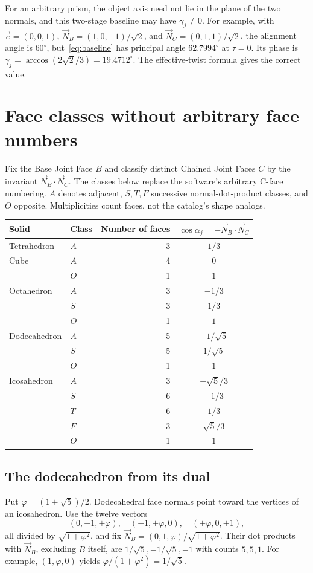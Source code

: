 \documentclass[11pt,letterpaper]{article}
\newcommand{\NB}{\vec N_B}
\newcommand{\NC}{\vec N_C}
\newcommand{\aj}{\alpha_j}
\newcommand{\gj}{\gamma_j}
\newcommand{\degc}{^{\circ}}
\newcommand{\ee}{\vec e}
\begin{document}
For an arbitrary prism, the object axis need not lie in the plane of the
two normals, and this two-stage baseline may have $\gj\ne0$.
For example, with $\ee=(0,0,1)$,
$\NB=(1,0,-1)/\sqrt2$, and $\NC=(0,1,1)/\sqrt2$, the alignment angle is
$60\degc$, but~\eqref{eq:baseline} has principal angle
$62.7994\degc$ at $\tau=0$. Its phase is
$\gj=\arccos(2\sqrt2/3)=19.4712\degc$.
The effective-twist formula gives the correct value.

\newpage
\section{Face classes without arbitrary face numbers}\label{sec:classes}
Fix the Base Joint Face $B$ and classify distinct Chained Joint Faces $C$
by the invariant $\NB\cdot\NC$. The classes below replace the software's
arbitrary C-face numbering. $A$ denotes adjacent, $S,T,F$ successive
normal-dot-product classes, and $O$ opposite. Multiplicities count faces,
not the catalog's shape analogs.

\begin{center}\small
\begin{tabular}{llrc}
\toprule
Solid & Class & Number of faces & $\cos\aj=-\NB\cdot\NC$\\
\midrule
Tetrahedron & $A$ & 3 & $1/3$\\
Cube & $A$ & 4 & $0$\\
     & $O$ & 1 & $1$\\
Octahedron & $A$ & 3 & $-1/3$\\
           & $S$ & 3 & $1/3$\\
           & $O$ & 1 & $1$\\
Dodecahedron & $A$ & 5 & $-1/\sqrt5$\\
             & $S$ & 5 & $1/\sqrt5$\\
             & $O$ & 1 & $1$\\
Icosahedron & $A$ & 3 & $-\sqrt5/3$\\
            & $S$ & 6 & $-1/3$\\
            & $T$ & 6 & $1/3$\\
            & $F$ & 3 & $\sqrt5/3$\\
            & $O$ & 1 & $1$\\
\bottomrule
\end{tabular}
\end{center}

\subsection{The dodecahedron from its dual}
Put $\varphi=(1+\sqrt5)/2$. Dodecahedral face normals point toward the
vertices of an icosahedron. Use the twelve vectors
\[
 (0,\pm1,\pm\varphi),\quad
 (\pm1,\pm\varphi,0),\quad
 (\pm\varphi,0,\pm1),
\]
all divided by $\sqrt{1+\varphi^2}$, and fix
$\NB=(0,1,\varphi)/\sqrt{1+\varphi^2}$. Their dot products with
$\NB$, excluding $B$ itself, are
$1/\sqrt5,-1/\sqrt5,-1$ with counts $5,5,1$. For example,
$(1,\varphi,0)$ yields
$\varphi/(1+\varphi^2)=1/\sqrt5$.
\end{document}
